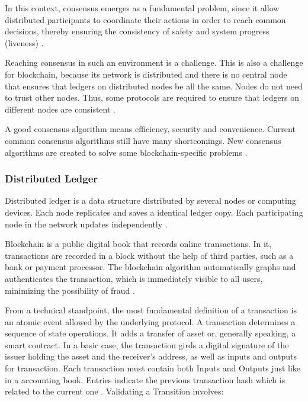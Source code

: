 In this context, consensus emerges as a fundamental problem, since it allow distributed participants to coordinate their actions in order to reach common decisions, thereby ensuring the consistency of safety and system progress (liveness) \cite{greve2018blockchain}.

Reaching consensus in such an environment is a challenge. This is also a challenge for blockchain, because its network is distributed and there is no central node that ensures that ledgers on distributed nodes be all the same. Nodes do not need to trust other nodes. Thus, some protocols are required to ensure that ledgers on different nodes are consistent \cite{kostarev2017review}.

A good consensus algorithm means efficiency, security and convenience. Current common consensus algorithms still have many shortcomings. New consensus algorithms are created to solve some blockchain-specific problems \cite{zheng2016blockchain}.

\subsubsection{Distributed Ledger}\label{sec:livro}
Distributed ledger is a data structure distributed by several nodes or computing devices. Each node replicates and saves a identical ledger copy. Each participating node in the network updates independently \cite{greve2018blockchain}.

\label{sec:transac}
Blockchain is a public digital book that records online transactions. In it, transactions are recorded in a block without the help of third parties, such as a bank or payment processor. The blockchain algorithm automatically graphs and authenticates the transaction, which is immediately visible to all users, minimizing the possibility of fraud \cite{Bankrate2018}.

From a technical standpoint, the most fundamental definition of a transaction is an atomic event allowed by the underlying protocol. A transaction determines a sequence of state operations. It adds a transfer of asset or, generally speaking, a smart contract. In a basic case, the transaction girds a digital signature of the issuer holding the asset and the receiver's address, as well as inputs and outputs for transaction. Each transaction must contain both Inputs and Outputs just like in a accounting book. Entries indicate the previous transaction hash which is related to the current one \cite{greve2018blockchain}. Validating a Transition involves:


